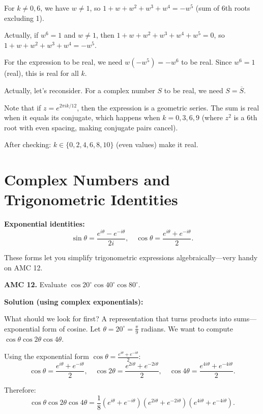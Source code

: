 \documentclass[12pt]{extarticle}
\begin{document}
For $k \neq 0, 6$, we have $w \neq 1$, so $1 + w + w^2 + w^3 + w^4 = -w^5$ (sum of 6th roots excluding 1).

Actually, if $w^6 = 1$ and $w \neq 1$, then $1 + w + w^2 + w^3 + w^4 + w^5 = 0$, so $1 + w + w^2 + w^3 + w^4 = -w^5$.

For the expression to be real, we need $w(-w^5) = -w^6$ to be real. Since $w^6 = 1$ (real), this is real for all $k$.

Actually, let's reconsider. For a complex number $S$ to be real, we need $S = \overline{S}$.

Note that if $z = e^{2\pi ik/12}$, then the expression is a geometric series. The sum is real when it equals its conjugate, which happens when $k = 0, 3, 6, 9$ (where $z^2$ is a 6th root with even spacing, making conjugate pairs cancel).

After checking: $k \in \{0, 2, 4, 6, 8, 10\}$ (even values) make it real.


\section{Complex Numbers and Trigonometric Identities}

\textbf{Exponential identities:}
\[
 \sin\theta = \frac{e^{i\theta} - e^{-i\theta}}{2i},\quad \cos\theta = \frac{e^{i\theta} + e^{-i\theta}}{2}.
\]

\begin{remarkbox}
These forms let you simplify trigonometric expressions algebraically—very handy on AMC 12.
\end{remarkbox}
\begin{examplebox}
\textbf{AMC 12.} Evaluate $\cos 20^\circ \cos 40^\circ \cos 80^\circ$.
\end{examplebox}

\textbf{Solution (using complex exponentials):}

What should we look for first? A representation that turns products into sums—exponential form of cosine.
Let $\theta = 20^\circ = \frac{\pi}{9}$ radians. We want to compute $\cos\theta \cos 2\theta \cos 4\theta$.

Using the exponential form $\cos\theta = \frac{e^{i\theta} + e^{-i\theta}}{2}$:
\[
\cos\theta = \frac{e^{i\theta} + e^{-i\theta}}{2}, \quad \cos 2\theta = \frac{e^{2i\theta} + e^{-2i\theta}}{2}, \quad \cos 4\theta = \frac{e^{4i\theta} + e^{-4i\theta}}{2}.
\]

Therefore:
\[
\cos\theta \cos 2\theta \cos 4\theta = \frac{1}{8}(e^{i\theta} + e^{-i\theta})(e^{2i\theta} + e^{-2i\theta})(e^{4i\theta} + e^{-4i\theta}).
\]
\end{document}
